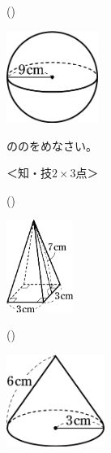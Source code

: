 \documentclass[
  12pt,a4paper,lualatex,ja=standard]{bxjsarticle}
\begin{document}
\begin{flushleft}
\begin{multicols}{3}
\begin{center}
\end{center}

\columnbreak

()\hspace{2.5pt}

\begin{center}
\def\@captype{figure}
\includegraphics[height=30mm]{img/img12.jpg}

\end{center}

\end{multicols}

\vfill

\setcounter{skaunta}{0}
\noindent{} \hspace{1pt}ののをめなさい。

%
\begin{flushright}%
\footnotesize{＜知・技$2 \times 3$点＞}%
\end{flushright}%


\begin{multicols}{3}

()\hspace{2.5pt}

\begin{center}
\def\@captype{figure}
\includegraphics[height=30mm]{img/img13.jpg}

\end{center}

\columnbreak

()\hspace{2.5pt}

\begin{center}
\def\@captype{figure}
\includegraphics[height=30mm]{img/img11.jpg}


\end{center}
\end{multicols}
\end{flushleft}
\end{document}

